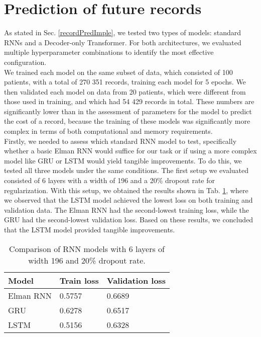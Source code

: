 
\section{Prediction of future records}
\label{recordPredRes}

As stated in Sec. \ref{recordPredImple}, we tested two types of models: standard RNNs and a Decoder-only Transformer. For both architectures, we evaluated multiple hyperparameter combinations to identify the most effective configuration.
\\

We trained each model on the same subset of data, which consisted of 100 patients, with a total of 270 351 records, training each model for 5 epochs. We then validated each model on data from 20 patients, which were different from those used in training, and which had 54 429 records in total. These numbers are significantly lower than in the assessment of parameters for the model to predict the cost of a record, because the training of these models was significantly more complex in terms of both computational and memory requirements.
\\

Firstly, we needed to assess which standard RNN model to test, specifically whether a basic Elman RNN would suffice for our task or if using a more complex model like GRU or LSTM would yield tangible improvements. To do this, we tested all three models under the same conditions. The first setup we evaluated consisted of 6 layers with a width of 196 and a 20\% dropout rate for regularization. With this setup, we obtained the results shown in Tab. \ref{tab:rnn_comp_1}, where we observed that the LSTM model achieved the lowest loss on both training and validation data. The Elman RNN had the second-lowest training loss, while the GRU had the second-lowest validation loss. Based on these results, we concluded that the LSTM model provided tangible improvements.
\\ 

\begin{table}[!h]
  	\centering
  	\begin{tabular}{|l|l|l|}
  		\hline
  		Model        & Train loss      & Validation loss \\ \hline
  	    Elman RNN    &  0.5757         & 0.6689          \\ \hline      
  		GRU          &  0.6278         & 0.6517          \\ \hline           
  		LSTM         &  0.5156         & 0.6328          \\ \hline
  	\end{tabular}
  	\caption{Comparison of RNN models with 6 layers of width 196 and 20\% dropout rate.}
  	\label{tab:rnn_comp_1}
\end{table}

